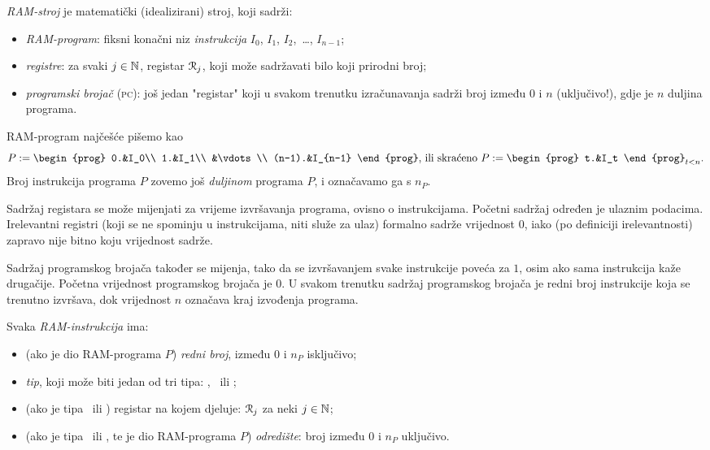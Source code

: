 \begin{definicija}
\emph{RAM-stroj} je matematički (idealizirani) stroj, koji sadrži:
\begin{itemize}
    \item \emph{RAM-program}: fiksni konačni niz \emph{instrukcija} $I_0$, $I_1$, $I_2$,~\ldots, $I_{n-1}$;
    \item \emph{registre}: za svaki $j\in{\mathbb N}$, registar $\mathcal R_{j}$, koji može sadržavati bilo koji prirodni broj;
    \item \emph{programski brojač} (\textsc{pc}): još jedan "registar" koji u svakom trenutku iz\-ra\-ču\-na\-va\-nja sadrži broj između $0$ i $n$ (uključivo!), gdje je $n$ duljina programa.
    \qedhere
\end{itemize}
\end{definicija}

RAM-program najčešće pišemo kao \begin{equation}
P:=\begin{prog}
    0.&I_0\\
    1.&I_1\\
    &\vdots\\
    (n-1).&I_{n-1}
    \end{prog}\text{, ili skraćeno } P:=\begin{prog}
    t.&I_t
    \end{prog}_{t<n}\text.
\end{equation}
Broj instrukcija programa $P$ zovemo još \emph{duljinom} programa $P$, i označavamo ga s $n_P$.

Sadržaj registara se može mijenjati za vrijeme izvršavanja programa, ovisno o instrukcijama. Početni sadržaj određen je ulaznim podacima. Irelevantni registri (koji se ne spominju u instrukcijama, niti služe za ulaz) formalno sadrže vrijednost $0$, iako (po definiciji irelevantnosti) zapravo nije bitno koju vrijednost sadrže.

Sadržaj programskog brojača također se mijenja, tako da se iz\-vr\-ša\-va\-njem svake instrukcije poveća za $1$, osim ako sama instrukcija kaže drugačije. Početna vrijednost programskog brojača je $0$. U svakom trenutku sadržaj programskog brojača je redni broj instrukcije koja se trenutno izvršava, dok vrijednost $n$ označava kraj izvođenja programa.

\begin{definicija}
Svaka \emph{RAM-instrukcija} ima:
\begin{itemize}
    \item (ako je dio RAM-programa $P$) \emph{redni broj}, između $0$ i $n_P$ isključivo;
    \item \emph{tip}, koji može biti jedan od tri tipa: \inc, \dec\ ili \goto;
    \item (ako je tipa \inc\ ili \dec) registar na kojem djeluje: $\mathcal R_{j}$ za neki $j\in{\mathbb N}$;
    \item (ako je tipa \dec\ ili \goto, te je dio RAM-programa $P$) \emph{odredište}: broj između $0$ i $n_P$ uključivo.
    \qedhere
\end{itemize}
\end{definicija}

